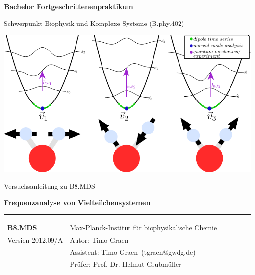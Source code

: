 \documentclass[a4paper,12pt]{article}
\begin{document}
\begin{center}
{\sffamily\bfseries\Huge Bachelor Fortgeschrittenenpraktikum}

{\sffamily\Large Schwerpunkt Biophysik und Komplexe Systeme (B.phy.402)}

\newcommand{\vk}{B8.MDS}
\newcommand{\vt}{Frequenzanalyse von Vielteilchensystemen}
\newcommand{\vv}{2012.09/A}
\newcommand{\vi}{Max-Planck-Institut f\"ur biophysikalische Chemie}
\newcommand{\va}{Timo Graen}

\vspace{\fill}

\includegraphics{oscillators.png}
\vspace{\fill}

{\sffamily\Large Versuchsanleitung zu \vk}

{\sffamily\bfseries\Huge
\vt\\}

\vspace{25mm}

\hrule
{\sffamily
\begin{tabular}{p{40mm}p{130mm}}
{\bfseries \vk} & \vi\\
Version \vv & Autor: \va\\
 & Assistent: \va \ (tgraen@gwdg.de)\\
 & Prüfer: Prof. Dr. Helmut Grubmüller
\end{tabular}

}

\end{center}
\newpage
\end{document}
